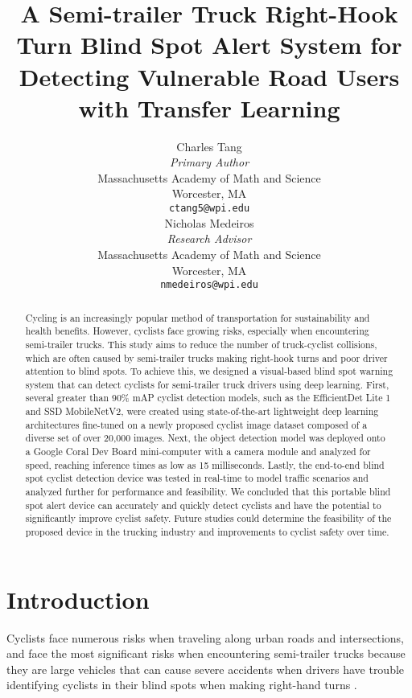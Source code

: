 \documentclass{article}
\title{A Semi-trailer Truck Right-Hook Turn Blind Spot Alert System for Detecting Vulnerable Road Users with Transfer Learning
}
\author{
  Charles Tang \\
  \textit{Primary Author} \\
  Massachusetts Academy of Math and Science \\
  Worcester, MA\\
  \texttt{ctang5@wpi.edu} \\
\And
  Nicholas Medeiros \\
  \textit{Research Advisor} \\
  Massachusetts Academy of Math and Science \\
  Worcester, MA\\
  \texttt{nmedeiros@wpi.edu} \\
}
\begin{document}
\maketitle


\begin{abstract}
Cycling is an increasingly popular method of transportation for sustainability and health benefits. However, cyclists face growing risks, especially when encountering semi-trailer trucks. This study aims to reduce the number of truck-cyclist collisions, which are often caused by semi-trailer trucks making right-hook turns and poor driver attention to blind spots. To achieve this, we designed a visual-based blind spot warning system that can detect cyclists for semi-trailer truck drivers using deep learning. First, several greater than 90\% mAP cyclist detection models, such as the EfficientDet Lite 1 and SSD MobileNetV2, were created using state-of-the-art lightweight deep learning architectures fine-tuned on a newly proposed cyclist image dataset composed of a diverse set of over 20,000 images. Next, the object detection model was deployed onto a Google Coral Dev Board mini-computer with a camera module and analyzed for speed, reaching inference times as low as 15 milliseconds. Lastly, the end-to-end blind spot cyclist detection device was tested in real-time to model traffic scenarios and analyzed further for performance and feasibility. We concluded that this portable blind spot alert device can accurately and quickly detect cyclists and have the potential to significantly improve cyclist safety. Future studies could determine the feasibility of the proposed device in the trucking industry and improvements to cyclist safety over time.
\end{abstract}



\twocolumn

\section{Introduction}
Cyclists face numerous risks when traveling along urban roads and intersections, and face the most significant risks when encountering semi-trailer trucks because they are large vehicles that can cause severe accidents when drivers have trouble identifying cyclists in their blind spots when making right-hand turns \cite{richter_turning_2017}. 
\end{document}
